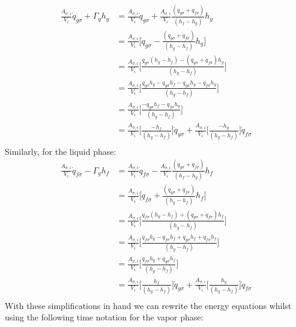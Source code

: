 \documentclass[11pt,letterpaper,titlepage]{article}
\begin{document}
\newline
\begin{equation*}
\begin{aligned}
\frac{A_{\sigma,i}}{V_i}\dot{q}_{g\sigma} +  \Gamma_g h_g
&=\frac{A_{\sigma,i}}{V_i}\dot{q}_{g\sigma} +  \frac{A_{\sigma,i}}{V_i} \frac{(\dot{q}_{g\sigma} + \dot{q}_{f\sigma})}{(h_f - h_g)} h_g\\
&=\frac{A_{\sigma,i}}{V_i} \biggr[\dot{q}_{g\sigma} - \frac{(\dot{q}_{g\sigma} + \dot{q}_{f\sigma})}{(h_g - h_f)} h_g  \biggr]\\
&=\frac{A_{\sigma,i}}{V_i} \biggr[\frac{\dot{q}_{g\sigma}(h_g - h_f) - (\dot{q}_{g\sigma} + \dot{q}_{f\sigma}) h_g}{(h_g-h_f)}  \biggr]\\
&=\frac{A_{\sigma,i}}{V_i} \biggr[\frac{\dot{q}_{g\sigma}h_g - \dot{q}_{g\sigma}h_f - \dot{q}_{g\sigma}h_g - \dot{q}_{f\sigma}h_g }{(h_g-h_f)}  \biggr]\\
&=\frac{A_{\sigma,i}}{V_i} \biggr[\frac{- \dot{q}_{g\sigma}h_f - \dot{q}_{f\sigma}h_g }{(h_g-h_f)}  \biggr]\\
&=\frac{A_{\sigma,i}}{V_i} \biggr[\frac{- h_f  }{(h_g-h_f)}  \biggr]\dot{q}_{g\sigma}
+\frac{A_{\sigma,i}}{V_i} \biggr[\frac{ - h_g }{(h_g-h_f)}  \biggr]\dot{q}_{f\sigma}\\
\end{aligned}
\end{equation*}
\newline
\noindent Similarly, for the liquid phase:
\begin{equation*}
\begin{aligned}
\frac{A_{\sigma,i}}{V_i}\dot{q}_{f\sigma} -  \Gamma_g h_f
&=\frac{A_{\sigma,i}}{V_i}\dot{q}_{f\sigma} -  \frac{A_{\sigma,i}}{V_i} \frac{(\dot{q}_{g\sigma} + \dot{q}_{f\sigma})}{(h_f - h_g)} h_f\\
&=\frac{A_{\sigma,i}}{V_i} \biggr[\dot{q}_{f\sigma} + \frac{(\dot{q}_{g\sigma} + \dot{q}_{f\sigma})}{(h_g - h_f)} h_f  \biggr]\\
&=\frac{A_{\sigma,i}}{V_i} \biggr[\frac{\dot{q}_{f\sigma}(h_g - h_f) + (\dot{q}_{g\sigma} + \dot{q}_{f\sigma}) h_f}{(h_g-h_f)}  \biggr]\\
&=\frac{A_{\sigma,i}}{V_i} \biggr[\frac{\dot{q}_{f\sigma}h_g - \dot{q}_{f\sigma}h_f + \dot{q}_{g\sigma}h_f + \dot{q}_{f\sigma}h_f }{(h_g-h_f)}  \biggr]\\
&=\frac{A_{\sigma,i}}{V_i} \biggr[\frac{\dot{q}_{f\sigma}h_g + \dot{q}_{g\sigma}h_f   }{(h_g-h_f)}  \biggr]\\
&=\frac{A_{\sigma,i}}{V_i} \biggr[\frac{ h_f  }{(h_g-h_f)}  \biggr]\dot{q}_{g\sigma}
+\frac{A_{\sigma,i}}{V_i} \biggr[\frac{ h_g }{(h_g-h_f)}  \biggr]\dot{q}_{f\sigma}\\
\end{aligned}
\end{equation*}
\newline
\newpage
\noindent 
With these simplifications in hand we can rewrite the energy equations whilst using the following time notation for the vapor phase:
\end{document}
